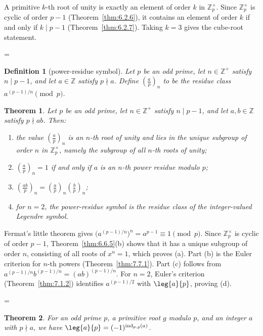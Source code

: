 \documentclass[11pt]{article}
\makeatletter
\theoremstyle{ntstyle}
\newtheorem{theorem}{Theorem}[subsection]
\newtheorem{definition}{Definition}[subsection]
\let\nt@closedisplay\]
\def\nt@guardedclose{\@ifnextchar\par{\nt@closeafterpar}{\@ifnextchar\end{\postdisplaypenalty\@M\nt@closedisplay}{\nt@closedisplay}}}
\def\nt@closeafterpar\par{\@ifnextchar\par{\nt@closeafterpar}{\@ifnextchar\end{\postdisplaypenalty\@M\nt@closedisplay\par}{\nt@closedisplay\par}}}
\renewenvironment{proof}[1][\proofname]{\par
  \pushQED{\qed}\normalfont\topsep\medskipamount\edef\nt@afterproof{\@endparpenalty=\the\@endparpenalty\relax}\@beginparpenalty\@M\@endparpenalty\@M\let\]\nt@guardedclose\trivlist\item[]\textit{#1\@addpunct{.}} \ignorespaces}{\ifvmode\addpenalty\@M\fi\popQED\nt@afterproof\endtrivlist\@endpefalse}
\newcommand{\pleg}[3]{\left(\frac{#1}{#2}\right)_{#3}}
\newcommand{\ZmodUnits}[1]{\mathbb{Z}_{#1}^{\times}}
\DeclareMathOperator{\ind}{ind}
\makeatother
\begin{document}
\begin{proof} A primitive $k$-th root of unity is exactly
	an element of order $k$ in $\ZmodUnits{p}$. Since
	$\ZmodUnits{p}$ is cyclic of order $p-1$ (Theorem~\ref{thm:6.2.6}), it
	contains
	an element of order $k$ if and only if $k \mid p-1$ (Theorem~\ref{thm:6.2.7}). Taking $k
		= 3$ gives the cube-root statement.


\end{proof}
\begin{definition}[power-residue symbol]\label{def:7.7.5} Let $p$
	be an odd prime, let $n\in\mathbb{Z}^+$ satisfy $n\mid p-1$, and let
	$a\in\mathbb{Z}$ satisfy $p\nmid a$. Define $\pleg{a}{p}{n}$
	to be the residue class $a^{(p-1)/n}\pmod{p}$.

\end{definition}
\begin{theorem}\label{thm:7.7.3} Let $p$ be an odd prime, let $n\in\mathbb{Z}^+$
	satisfy $n\mid p-1$, and let $a,b\in\mathbb{Z}$ satisfy $p\nmid ab$.
	Then:
	\begin{enumerate}[label={\alph*)}]
		\item the value $\pleg{a}{p}{n}$ is an $n$-th root of unity and lies
		      in the unique subgroup of order $n$ in $\ZmodUnits{p}$, namely
		      the subgroup of all $n$-th roots of unity;
		\item $\pleg{a}{p}{n}=1$ if and only if $a$ is an $n$-th power
		      residue modulo $p$;
		\item $\pleg{ab}{p}{n}=\pleg{a}{p}{n}\pleg{b}{p}{n}$;
		\item for $n=2$, the power-residue symbol is the residue class of the integer-valued Legendre symbol.
	\end{enumerate}

\end{theorem}

\begin{proof} Fermat's little theorem gives
	$\big(a^{(p-1)/n}\big)^n=a^{p-1}\equiv1\pmod{p}$. Since
	$\ZmodUnits{p}$ is cyclic of order $p-1$, Theorem~\ref{thm:6.6.5}(b) shows that it has a unique
	subgroup of order $n$, consisting of all roots of $x^n=1$, which proves
	(a). Part (b) is the Euler criterion for $n$-th powers (Theorem~\ref{thm:7.7.1}). Part (c) follows from
	$a^{(p-1)/n}b^{(p-1)/n}=(ab)^{(p-1)/n}$. For $n=2$, Euler's criterion
	(Theorem~\ref{thm:7.1.2}) identifies $a^{(p-1)/2}$ with $\leg{a}{p}$, proving
	(d).

\end{proof}
\begin{theorem}\label{thm:7.7.4} For an odd
	prime $p$, a primitive root $g$ modulo $p$, and an integer $a$ with $p
		\nmid a$, we have $\leg{a}{p} = (-1)^{\ind_{p,g}(a)}$.

\end{theorem}
\end{document}
